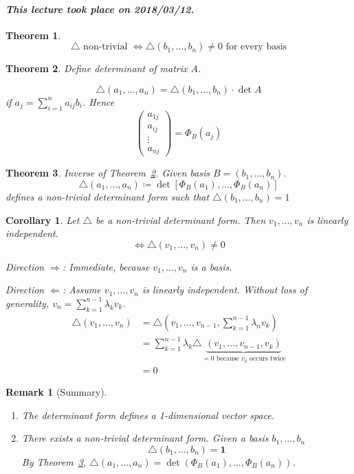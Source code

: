 \documentclass{article}
\newtheorem{theorem}{Theorem}  \numberwithin{theorem}{section}
\newtheorem{remark}{Remark}  \numberwithin{remark}{section}
\newtheorem*{corollary}{Corollary}%
\newcommand{\dateref}[1]{\paragraph{\textit{This lecture took place on #1.}}}
\begin{document}
\dateref{2018/03/12}

\begin{theorem} %
  \[ \triangle \text{ non-trivial } \iff \triangle(b_1, \dots, b_n) \neq 0 \text{ for every basis} \]
\end{theorem}

\begin{theorem} %
  \label{thm720}
  Define determinant of matrix $A$.

  \[ \triangle(a_1, \dots, a_n) = \triangle(b_1, \dots, b_n) \cdot \det{A} \]
  if $a_j = \sum_{i=1}^n a_{ij} b_i$.
  Hence
  \[ \begin{pmatrix} a_{1j} \\ a_{ij} \\ \vdots \\ a_{nj} \end{pmatrix} = \Phi_{B}(a_j) \]
\end{theorem}

\begin{theorem} %
  \label{theorem722}
  Inverse of Theorem~\ref{thm720}.
  Given basis $B = (b_1, \dots, b_n)$.
  \[ \triangle(a_1, \dots, a_n) \coloneqq \det\left[\Phi_B(a_1), \dots, \Phi_B(a_n)\right] \]
  defines a non-trivial determinant form such that $\triangle(b_1, \dots, b_n) = 1$
\end{theorem}

\begin{corollary} %
  \label{folgerung723}
  Let $\triangle$ be a non-trivial determinant form.
  Then $v_1, \dots, v_n$ is linearly independent.
  \[ \iff \triangle(v_1, \dots, v_n) \neq 0 \]

  Direction $\Rightarrow$: Immediate, because $v_1, \dots, v_n$ is a basis.

  Direction $\Leftarrow$: Assume $v_1, \dots, v_n$ is linearly independent.
  Without loss of generality, $v_n = \sum_{k=1}^{n-1} \lambda_k v_k$.
  \begin{align*}
    \triangle(v_1, \dots, v_n) &= \triangle(v_1, \dots, v_{n-1}, \sum_{k=1}^{n-1} \lambda_n v_k) \\
      &= \sum_{k=1}^{n-1} \lambda_k \triangle \underbrace{(v_1, \dots, v_{n-1}, v_k)}_{=0 \text{ because $v_k$ occurs twice}} \\
      &= 0
  \end{align*}
\end{corollary}

\begin{remark}[Summary]
  \begin{enumerate}
    \item The determinant form defines a 1-dimensional vector space.
    \item There exists a non-trivial determinant form. Given a basis $b_1, \dots, b_n$
      \[ \triangle(b_1, \dots, b_n) = \mathbf 1 \]
      By Theorem~\ref{theorem722}, $\triangle(a_1, \dots, a_n) = \det(\Phi_B(a_1), \dots, \Phi_B(a_n))$.
  \end{enumerate}
\end{remark}
\end{document}
